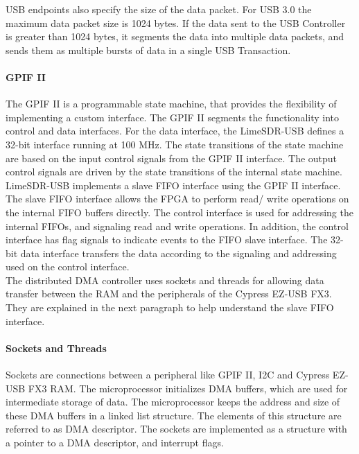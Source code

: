
USB endpoints also specify the size of the data packet.
For USB 3.0 the maximum data packet size is 1024 bytes.
If the data sent to the USB Controller is greater than 1024 bytes, it segments the data into multiple data packets, and sends them as multiple bursts of data in a single USB Transaction. 
 
\paragraph{GPIF II}
The \ac{GPIF} II is a programmable state machine, that provides the flexibility of implementing a custom interface.
The GPIF II segments the functionality into control and data interfaces.
For the data interface, the LimeSDR-USB defines a 32-bit interface running at 100 MHz.
The state transitions of the state machine are based on the input control signals from the GPIF II interface.
The output control signals are driven by the state transitions of the internal state machine.\\

LimeSDR-USB implements a slave FIFO interface using the \ac{GPIF} II interface.
The slave FIFO interface allows the \ac{FPGA} to perform read/ write operations on the internal FIFO buffers directly.
The control interface is used for addressing the internal FIFOs, and signaling read and write operations.
In addition, the control interface has flag signals to indicate events to the FIFO slave interface.
The 32-bit data interface transfers the data according to the signaling and addressing used on the control interface.\\

The distributed \ac{DMA} controller uses sockets and threads for allowing data transfer between the \ac{RAM} and the peripherals of the Cypress EZ-USB FX3.
They are explained in the next paragraph to help understand the slave FIFO interface.

\paragraph{Sockets and Threads}
Sockets are connections between a peripheral like GPIF II, I2C and Cypress EZ-USB FX3 RAM. 
The microprocessor initializes \ac{DMA} buffers, which are used for intermediate storage of data.
The microprocessor keeps the address and size of these \ac{DMA} buffers in a linked list structure.
The elements of this structure are referred to as \ac{DMA} descriptor.
The sockets are implemented as a structure with a pointer to a \ac{DMA} descriptor, and interrupt flags.\\ 

